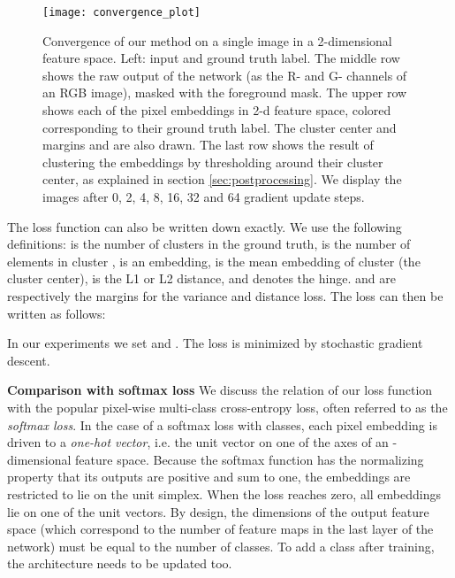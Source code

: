 \documentclass[10pt,twocolumn,letterpaper]{article}
\begin{document}
\begin{figure*}
	\begin{center}
\texttt{[image: convergence\_plot]}
	\end{center}
	\caption{Convergence of our method on a single image in a 2-dimensional feature space. Left: input and ground truth label. The middle row shows the raw output of the network (as the R- and G- channels of an RGB image), masked with the foreground mask. The upper row shows each of the pixel embeddings  in 2-d feature space, colored corresponding to their ground truth label. The cluster center  and margins  and  are also drawn. The last row shows the result of clustering the embeddings by thresholding around their cluster center, as explained in section \ref{sec:postprocessing}. We display the images after 0, 2, 4, 8, 16, 32 and 64 gradient update steps.}
	\label{fig:convergence}
\end{figure*}

The loss function can also be written down exactly. We use the following definitions:  is the number of clusters in the ground truth,  is the number of elements in cluster ,  is an embedding,  is the mean embedding of cluster  (the cluster center),  is the L1 or L2 distance, and  denotes the hinge.  and  are respectively the margins for the variance and distance loss.
The loss can then be written as follows: 









In our experiments we set  and . The loss is minimized by stochastic gradient descent.

\textbf{Comparison with softmax loss}
We discuss the relation of our loss function with the popular pixel-wise multi-class cross-entropy loss, often referred to as the \textit{softmax loss}. In the case of a softmax loss with  classes, each pixel embedding is driven to a \textit{one-hot vector}, i.e. the unit vector on one of the axes of an -dimensional feature space. Because the softmax function has the normalizing property that its outputs are positive and sum to one, the embeddings are restricted to lie on the unit simplex. When the loss reaches zero, all embeddings lie on one of the unit vectors. By design, the dimensions of the output feature space (which correspond to the number of feature maps in the last layer of the network) must be equal to the number of classes. To add a class after training, the architecture needs to be updated too.
\end{document}
